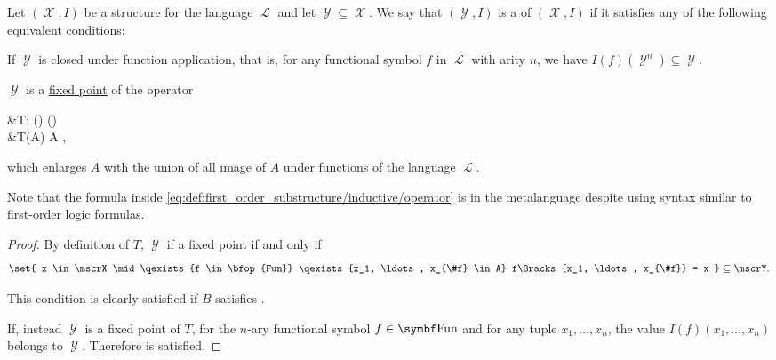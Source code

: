 \begin{definition}\label{def:first_order_substructure}
  Let \( (\mscrX, I) \) be a structure for the language \( \mscrL \) and let \( \mscrY \subseteq \mscrX \). We say that \( (\mscrY, I) \) is a  of \( (\mscrX, I) \) if it satisfies any of the following equivalent conditions:

  \begin{thmenum}
     If \( \mscrY \) is closed under function application, that is, for any functional symbol \( f \) in \( \mscrL \) with arity \( n \), we have \( I(f)(\mscrY^n) \subseteq \mscrY \).

     \( \mscrY \) is a \hyperref[def:fixed_point]{fixed point} of the operator
    \begin{alignedeq}\label{eq:def:first_order_substructure/inductive/operator}
      &T: \pow(\mscrX) \to \pow(\mscrX) \\
      &T(A) \coloneqq A \cup {},
    \end{alignedeq}
    which enlarges \( A \) with the union of all image of \( A \) under functions of the language \( \mscrL \).

    Note that the formula inside \eqref{eq:def:first_order_substructure/inductive/operator} is in the metalanguage despite using syntax similar to first-order logic formulas.
  \end{thmenum}
\end{definition}
\begin{proof}
  By definition of \( T \), \( \mscrY \) if a fixed point if and only if
  \begin{equation*}
    \set{ x \in \mscrX \mid \qexists{f \in \bfop{Fun}} \qexists{x_1, \ldots, x_{\#f} \in A} f\Bracks{x_1, \ldots, x_{\#f}} = x } \subseteq \mscrY.
  \end{equation*}

  This condition is clearly satisfied if \( B \) satisfies .

  If, instead \( \mscrY \) is a fixed point of \( T \), for the \( n \)-ary functional symbol \( f \in \bfop{Fun} \) and for any tuple \( x_1, \ldots, x_n \), the value \( I(f)(x_1, \ldots, x_n) \) belongs to \( \mscrY \). Therefore  is satisfied.
\end{proof}

